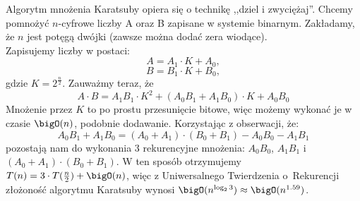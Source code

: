 Algorytm mnożenia Karatsuby opiera się o technikę ,,dziel i zwyciężaj''.
Chcemy pomnożyć \(n\)-cyfrowe liczby A oraz B zapisane w systemie binarnym. Zakładamy, że $n$ jest potęgą dwójki (zawsze można dodać zera wiodące). \\
Zapisujemy liczby w postaci:
\[
    A = A_1 \cdot K + A_0,
\]
\[
    B = B_1 \cdot K + B_0,
\]
gdzie \( K = 2^{\frac{n}{2}} \). Zauważmy teraz, że
\[
    A \cdot B = A_1 B_1 \cdot K^2 + (A_0 B_1 + A_1 B_0) \cdot K + A_0 B_0
\]
Mnożenie przez \( K \) to po prostu przesunięcie bitowe, więc możemy wykonać je w czasie \( \bigO(n) \), podobnie dodawanie. Korzystając z obserwacji, że:
\[
    A_0 B_1 + A_1 B_0 = (A_0 + A_1) \cdot (B_0 + B_1) - A_0 B_0 - A_1 B_1
\]
pozostają nam do wykonania 3 rekurencyjne mnożenia: \( A_0 B_0 \), \( A_1 B_1 \) i \( (A_0 + A_1) \cdot (B_0 + B_1) \). W ten sposób otrzymujemy \( T(n) = 3 \cdot T(\frac{n}{2}) + \bigO(n) \), więc z Uniwersalnego Twierdzenia o~Rekurencji złożoność algorytmu Karatsuby wynosi \( \bigO(n^{\log_2 3}) \approx \bigO(n^{1.59}) \).
